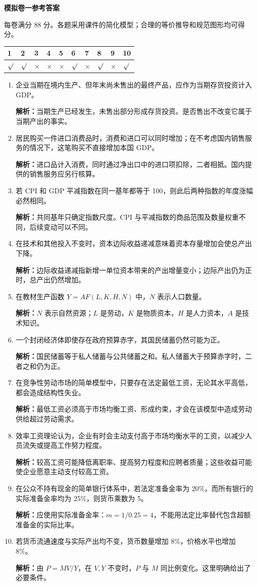 \documentclass[UTF8,11pt,a4paper,fontset=fandol]{ctexart}
\newcommand{\sect}[1]{\par\vspace{0.7em}{\large\bfseries #1}\par\vspace{0.6em}}
\newcommand{\ans}[1]{\par\textbf{解析：}#1\par}
\begin{document}
{\Large\bfseries 模拟卷一参考答案}\par
\smallskip 每卷满分 88 分。各题采用课件的简化模型；合理的等价推导和规范图形均可得分。
\sect{一、判断题（每题 2 分，共 20 分）}
\par\smallskip\begin{tabularx}{\linewidth}{|*{10}{Y|}}&2&3&4&5&6&7&8&9&10\\\hline
$\surd$&$\surd$&$\times$&$\times$&$\times$&$\surd$&$\times$&$\surd$&$\times$&$\surd$\\\hline
\end{tabularx}\par\smallskip
\begin{enumerate}[label=\arabic*.,leftmargin=*,itemsep=0.7em,topsep=0.3em]
\item 企业当期在境内生产、但年末尚未售出的最终产品，应作为当期存货投资计入 GDP。
\ans{当期生产已经发生，未售出部分形成存货投资。是否售出不改变它属于当期产出的事实。}
\item 居民购买一件进口消费品时，消费和进口可以同时增加；在不考虑国内销售服务的情况下，这笔购买不直接增加本国 GDP。
\ans{进口品计入消费，同时通过净出口中的进口项扣除，二者相抵。国内提供的销售服务应另行核算。}
\item 若 CPI 和 GDP 平减指数在同一基年都等于 100，则此后两种指数的年度涨幅必然相同。
\ans{共同基年只确定指数尺度。CPI 与平减指数的商品范围及数量权重不同，后续变动可以不同。}
\item 在技术和其他投入不变时，资本边际收益递减意味着资本存量增加会使总产出下降。
\ans{边际收益递减指新增一单位资本带来的产出增量变小；边际产出仍为正时，总产出仍然增加。}
\item 在教材生产函数 $Y=AF(L,K,H,N)$ 中，$N$ 表示人口数量。
\ans{$N$ 表示自然资源；$L$ 是劳动，$K$ 是物质资本，$H$ 是人力资本，$A$ 是技术知识。}
\item 一个封闭经济体即使存在政府预算赤字，其国民储蓄仍然可能为正。
\ans{国民储蓄等于私人储蓄与公共储蓄之和。私人储蓄大于预算赤字时，二者之和仍为正。}
\item 在竞争性劳动市场的简单模型中，只要存在法定最低工资，无论其水平高低，都会造成结构性失业。
\ans{最低工资必须高于市场均衡工资、形成约束，才会在该模型中造成劳动供给超过劳动需求。}
\item 效率工资理论认为，企业有时会主动支付高于市场均衡水平的工资，以减少人员流失或提高工作努力程度。
\ans{较高工资可能降低离职率、提高努力程度和应聘者质量；这些收益可能使企业愿意主动支付较高工资。}
\item 在公众不持有现金的简单银行体系中，若法定准备金率为 20\%，而所有银行的实际准备金率均为 25\%，则货币乘数为 5。
\ans{应使用实际准备金率：$m=1/0.25=4$，不能用法定比率替代包含超额准备金的实际比率。}
\item 若货币流通速度与实际产出均不变，货币数量增加 8\%，价格水平也增加 8\%。
\ans{由 $P=MV/Y$，在 $V,Y$ 不变时，$P$ 与 $M$ 同比例变化。这里明确给出了必要条件。}
\end{enumerate}
\end{document}
